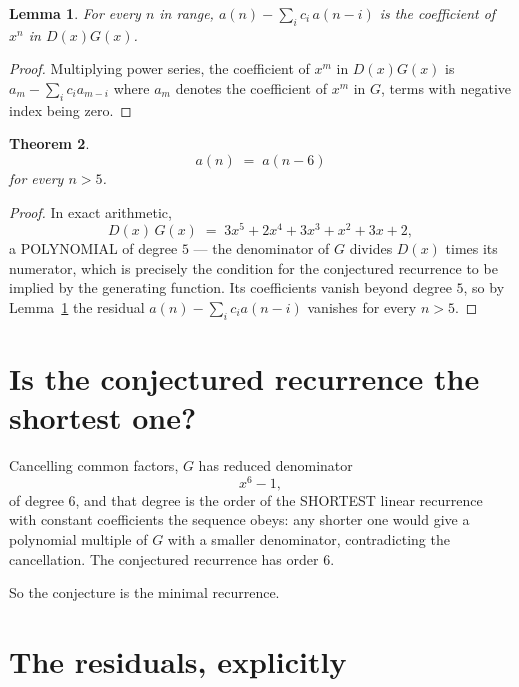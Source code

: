 \documentclass[11pt,a4paper]{article}
\theoremstyle{plain}
\newtheorem{theorem}{Theorem}
\newtheorem{lemma}[theorem]{Lemma}
\theoremstyle{definition}
\begin{document}
\begin{lemma}\label{lem:key}
For every $n$ in range, $a(n)-\sum_i c_i\,a(n-i)$ is the coefficient of $x^{n}$ in
$D(x)G(x)$.
\end{lemma}

\begin{proof}
Multiplying power series, the coefficient of $x^{m}$ in $D(x)G(x)$ is
$a_m-\sum_i c_i a_{m-i}$ where $a_m$ denotes the coefficient of $x^{m}$ in $G$, terms with
negative index being zero.
\end{proof}

\begin{theorem}
\[
a(n)\;=\;a(n-6)
\]
for every $n>5$.
\end{theorem}

\begin{proof}
In exact arithmetic,
\[
D(x)\,G(x)\;=\;3 x^{5} + 2 x^{4} + 3 x^{3} + x^{2} + 3 x + 2,
\]
a POLYNOMIAL of degree $5$ --- the denominator of $G$ divides $D(x)$ times its numerator,
which is precisely the condition for the conjectured recurrence to be implied by the
generating function. Its coefficients vanish beyond degree $5$, so by
Lemma~\ref{lem:key} the residual $a(n)-\sum_ic_ia(n-i)$ vanishes for every
$n>5$.
\end{proof}

\section{Is the conjectured recurrence the shortest one?}

Cancelling common factors, $G$ has reduced denominator
\[
x^{6} - 1,
\]
of degree $6$, and that degree is the order of the SHORTEST linear recurrence with
constant coefficients the sequence obeys: any shorter one would give a polynomial multiple of
$G$ with a smaller denominator, contradicting the cancellation. The conjectured recurrence has
order $6$.

So the conjecture is the minimal recurrence.

\section{The residuals, explicitly}
\end{document}
